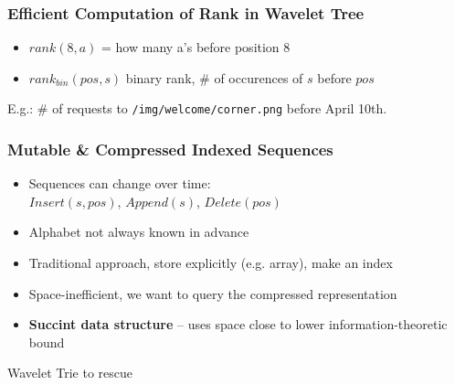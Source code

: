 \documentclass{beamer}
\begin{document}
\begin{frame}
\frametitle{Efficient Computation of Rank in Wavelet Tree}
\begin{itemize}
  \item $rank(8, a)$ = how many a's before position 8
  \item $rank_{bin}(pos, s)$ binary rank, \# of occurences of $s$ before $pos$  
\end{itemize}
\begin{figure}
\end{figure}
{\small E.g.: \# of requests to \texttt{/img/welcome/corner.png} before April 10th.}
\end{frame}


\begin{frame}
\frametitle{Mutable \& Compressed Indexed Sequences}
\begin{itemize}
  \item Sequences can change over time:\\$Insert(s, pos)$, $Append(s)$, $Delete(pos)$
  \item Alphabet not always known in advance 
\end{itemize}
\vspace{10pt}
\begin{itemize}
  \item Traditional approach, store explicitly (e.g. array), make an index
  \item Space-inefficient, we want to query the compressed representation
  \item {\bf Succint data structure} -- uses space close to lower information-theoretic bound
\end{itemize}
\vspace{10pt}
\hspace{10pt}
Wavelet Trie to rescue
\end{frame}
\end{document}
